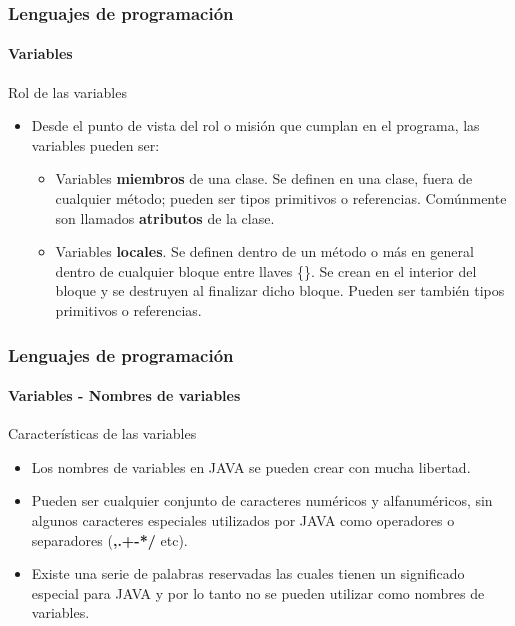 \documentclass{beamer}
\begin{document}
\begin{frame}
  \frametitle{Lenguajes de programación}
  \framesubtitle{Variables}

  \begin{block}{Rol de las variables}
    \begin{itemize}
    \item Desde el punto de vista del rol o misión que cumplan en el programa, las variables pueden ser:
      \begin{itemize}
      \item Variables \textbf{miembros} de una clase. Se definen en una clase, fuera de cualquier método; pueden ser tipos primitivos o referencias. Comúnmente son llamados \textbf{atributos} de la clase.
      \item Variables \textbf{locales}. Se definen dentro de un método o más en general dentro de cualquier bloque entre llaves \{\}. Se crean en el interior del bloque y se destruyen al finalizar dicho bloque. Pueden ser también tipos primitivos o referencias.
      \end{itemize}
    \end{itemize}
  \end{block}
\end{frame}

\begin{frame}
  \frametitle{Lenguajes de programación}
  \framesubtitle{Variables - Nombres de variables}

  \begin{block}{Características de las variables}
    \begin{itemize}
    \item Los nombres de variables en JAVA se pueden crear con mucha libertad.
    \item Pueden ser cualquier conjunto de caracteres numéricos y alfanuméricos, sin algunos caracteres especiales utilizados por JAVA como operadores o separadores (\textbf{,.+-*/} etc).
    \item Existe una serie de palabras reservadas las cuales tienen un significado especial para JAVA y por lo tanto no se pueden utilizar como nombres de variables.
    \end{itemize}
  \end{block}
\end{frame}
\end{document}
